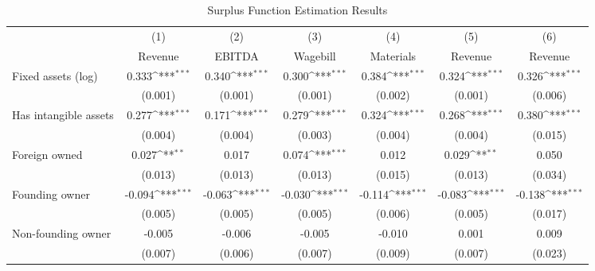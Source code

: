 \begin{table}[htbp]\centering
\def\sym#1{\ifmmode^{#1}\else\(^{#1}\)\fi}
\caption{Surplus Function Estimation Results}
\begin{tabular}{l*{6}{c}}
\toprule
                    &\multicolumn{1}{c}{(1)}&\multicolumn{1}{c}{(2)}&\multicolumn{1}{c}{(3)}&\multicolumn{1}{c}{(4)}&\multicolumn{1}{c}{(5)}&\multicolumn{1}{c}{(6)}\\
                    &\multicolumn{1}{c}{Revenue}&\multicolumn{1}{c}{EBITDA}&\multicolumn{1}{c}{Wagebill}&\multicolumn{1}{c}{Materials}&\multicolumn{1}{c}{Revenue}&\multicolumn{1}{c}{Revenue}\\
\midrule
Fixed assets (log)  &       0.333\sym{***}&       0.340\sym{***}&       0.300\sym{***}&       0.384\sym{***}&       0.324\sym{***}&       0.326\sym{***}\\
                    &     (0.001)         &     (0.001)         &     (0.001)         &     (0.002)         &     (0.001)         &     (0.006)         \\
\addlinespace
Has intangible assets&       0.277\sym{***}&       0.171\sym{***}&       0.279\sym{***}&       0.324\sym{***}&       0.268\sym{***}&       0.380\sym{***}\\
                    &     (0.004)         &     (0.004)         &     (0.003)         &     (0.004)         &     (0.004)         &     (0.015)         \\
\addlinespace
Foreign owned       &       0.027\sym{**} &       0.017         &       0.074\sym{***}&       0.012         &       0.029\sym{**} &       0.050         \\
                    &     (0.013)         &     (0.013)         &     (0.013)         &     (0.015)         &     (0.013)         &     (0.034)         \\
\addlinespace
Founding owner      &      -0.094\sym{***}&      -0.063\sym{***}&      -0.030\sym{***}&      -0.114\sym{***}&      -0.083\sym{***}&      -0.138\sym{***}\\
                    &     (0.005)         &     (0.005)         &     (0.005)         &     (0.006)         &     (0.005)         &     (0.017)         \\
\addlinespace
Non-founding owner  &      -0.005         &      -0.006         &      -0.005         &      -0.010         &       0.001         &       0.009         \\
                    &     (0.007)         &     (0.006)         &     (0.007)         &     (0.009)         &     (0.007)         &     (0.023)         \\

\end{tabular}
\end{table}
